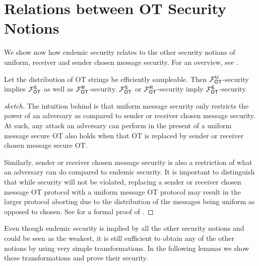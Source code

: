 \section{Relations between OT Security Notions}\label{sec:relot}

We show now how endemic security relates to the other security notions of uniform, receiver and sender chosen message security. For an overview, see .
\begin{lemma}\label{lemma:is_a}
Let the distribution of OT strings be efficiently sampleable. 
Then $\mathcal{F}_{\mathsf{OT}}^\mathsf{U}$-security implies $\mathcal{F}_{\mathsf{OT}}^{\mathsf{S}}$ as well as $\mathcal{F}_{\mathsf{OT}}^\mathsf{R}$-security. $\mathcal{F}_{\mathsf{OT}}^{\mathsf{S}}$ or $\mathcal{F}_{\mathsf{OT}}^\mathsf{R}$-security imply $\mathcal{F}_{\mathsf{OT}}^\mathsf{E}$-security.
\end{lemma}

\iffullversion

\else
\begin{proof}[sketch]
	The intuition behind   is that uniform message security only restricts the power of an adversary as compared to sender or receiver chosen message security. At such, any attack an adversary can perform in the present of a uniform message secure OT also holds when that OT is replaced by sender or receiver chosen message secure OT. 
	
	Similarly, sender or receiver chosen message security is also a restriction of what an adversary can do compared to endemic security. It is important to distinguish that while security will not be violated, replacing a sender or receiver chosen message OT protocol with a uniform message OT protocol may result in the larger protocol aborting due to the distribution of the messages being uniform as opposed to chosen. See   for a formal proof of .
\end{proof}
\fi



Even though endemic security is implied by all the other security notions and could be seen as the weakest, it is still sufficient to obtain any of the other notions by using very simple transformations. In the following lemmas we show these transformations and prove their security.   

